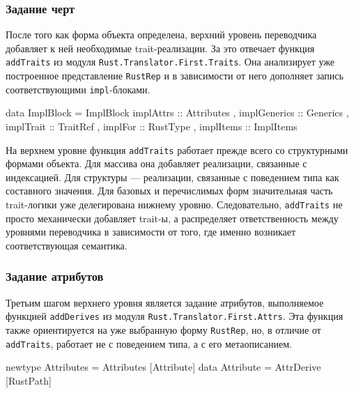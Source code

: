 \documentclass[a4paper,12pt]{article}
\begin{document}
\subsubsection{Задание черт}

После того как форма объекта определена, верхний уровень переводчика добавляет к ней
необходимые trait-реализации. За это отвечает функция \texttt{addTraits} из модуля
\texttt{Rust.Translator.First.Traits}. Она анализирует уже построенное представление
\texttt{RustRep} и в зависимости от него дополняет запись соответствующими
\texttt{impl}-блоками.

\begin{flushleft}
\label{lst:impl-block}
\begin{MyCodes}
data ImplBlock = ImplBlock
  { implAttrs    :: Attributes
  , implGenerics :: Generics
  , implTrait    :: TraitRef
  , implFor      :: RustType
  , implItems    :: ImplItems
  }
\end{MyCodes}
\end{flushleft}

На верхнем уровне функция \texttt{addTraits} работает прежде всего со структурными
формами объекта. Для массива она добавляет реализации, связанные с индексацией. Для
структуры --- реализации, связанные с поведением типа как составного значения. Для
базовых и перечислимых форм значительная часть trait-логики уже делегирована нижнему
уровню. Следовательно, \texttt{addTraits} не просто механически добавляет trait-ы, а
распределяет ответственность между уровнями переводчика в зависимости от того, где
именно возникает соответствующая семантика.

\subsubsection{Задание атрибутов}

Третьим шагом верхнего уровня является задание атрибутов, выполняемое функцией
\texttt{addDerives} из модуля \texttt{Rust.Translator.First.Attrs}. Эта функция также
ориентируется на уже выбранную форму \texttt{RustRep}, но, в отличие от
\texttt{addTraits}, работает не с поведением типа, а с его метаописанием.

\begin{flushleft}
\label{lst:rust-attributes}
\begin{MyCodes}
newtype Attributes = Attributes [Attribute]
data Attribute
  = AttrDerive [RustPath]
\end{MyCodes}
\end{flushleft}
\end{document}
